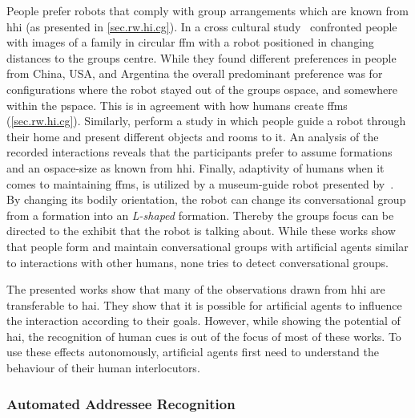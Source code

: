People prefer \glspl{robot} that comply with group arrangements which are known from \gls{hhi} (as presented in \cref{sec.rw.hi.cg}).
In a cross cultural study~ confronted people with images of a family in circular \gls{ffm} with a \gls{robot} positioned in changing distances to the groups centre.
While they found different preferences in people from China, USA, and Argentina the overall predominant preference was for configurations where the \gls{robot} stayed out of the groups \gls{ospace}, and somewhere within the \gls{pspace}.
This is in agreement with how humans create \glspl{ffm} (\cref{sec.rw.hi.cg}).
Similarly,  perform a study in which people guide a \gls{robot} through their home and present different objects and rooms to it.
An analysis of the recorded interactions reveals that the participants prefer to assume \emph{\visavis} formations and an \gls{ospace}-size as known from \gls{hhi}.
Finally, adaptivity of humans when it comes to maintaining \glspl{ffm}, is utilized by a museum-guide \gls{robot} presented by~.
By changing its bodily orientation, the \gls{robot} can change its \gls{conversational group} from a \emph{\visavis} formation into an \emph{L-shaped} formation.
Thereby the groups focus can be directed to the exhibit that the \gls{robot} is talking about.
While these works show that people form and maintain \glspl{conversational group} with \glspl{artificial agent} similar to interactions with other humans, none tries to detect \glspl{conversational group}.

The presented works show that many of the observations drawn from \gls{hhi} are transferable to \gls{hai}.
They show that it is possible for \glspl{artificial agent} to influence the interaction according to their goals.
However, while showing the potential of \gls{hai}, the recognition of human  cues is out of the focus of most of these works.
To use these effects autonomously, \glspl{artificial agent} first need to understand the behaviour of their human interlocutors.

\subsubsection{Automated Addressee Recognition}\label{sec.rw.hi.focused-rw.addressing}

